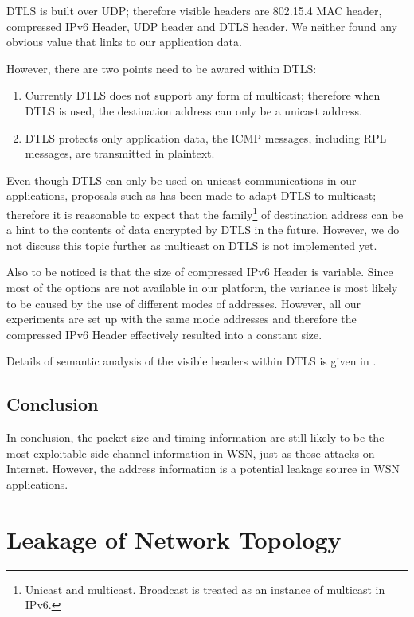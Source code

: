 DTLS is built over UDP; therefore visible headers are 802.15.4 MAC header, compressed IPv6 Header, UDP header and DTLS header. We neither found any obvious value that links to our application data.

However, there are two points need to be awared within DTLS:
\begin{enumerate}
	\item Currently DTLS does not support any form of multicast; therefore when DTLS is used, the destination address can only be a unicast address. 

	\item DTLS protects only application data, the ICMP messages, including RPL messages, are transmitted in plaintext.
\end{enumerate}

Even though DTLS can only be used on unicast communications in our applications, proposals such as \cite{DtlsMulticast1} \cite{DtlsMulticast2} has been made to adapt DTLS to multicast; therefore it is reasonable to expect that the family\footnote{Unicast and multicast. Broadcast is treated as an instance of multicast in IPv6.} of destination address can be a hint to the contents of data encrypted by DTLS in the future. However, we do not discuss this topic further as multicast on DTLS is not implemented yet.

Also to be noticed is that the size of compressed IPv6 Header is variable. Since most of the options are not available in our platform, the variance is most likely to be caused by the use of different modes of addresses. However, all our experiments are set up with the same mode addresses and therefore the compressed IPv6 Header effectively resulted into a constant size.

Details of semantic analysis of the visible headers within DTLS is given in . 

\subsection{Conclusion}

In conclusion, the packet size and timing information are still likely to be the most exploitable side channel information in WSN, just as those attacks on Internet. However, the address information is a potential leakage source in WSN applications.

\section{Leakage of Network Topology} \label{Sec: Leakage of Network Topology}

